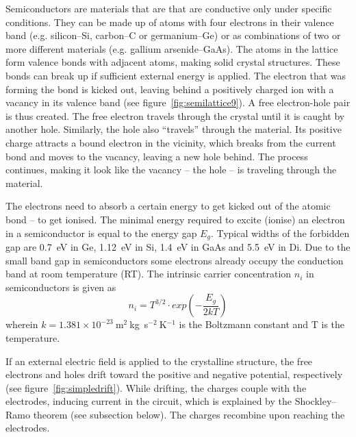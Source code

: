 \documentclass[twoside,12pt]{packages/mytustyle}  %
\begin{document}
Semiconductors are materials that are that are conductive only under specific conditions. They can be made up of atoms with four electrons in their valence band (e.g. silicon--Si, carbon--C or germanium--Ge) or as combinations of two or more different materials (e.g. gallium arsenide--GaAs). The atoms in the lattice form valence bonds with adjacent atoms, making solid crystal structures. These bonds can break up if sufficient external energy is applied. The electron that was forming the bond is kicked out, leaving behind a positively charged ion with a vacancy in its valence band (see figure~\ref{fig:semilattice9}). A free electron-hole pair is thus created. The free electron travels through the crystal until it is caught by another hole. Similarly, the hole also ``travels'' through the material. Its positive charge attracts a bound electron in the vicinity, which breaks from the current bond and moves to the vacancy, leaving a new hole behind. The process continues, making it look like the vacancy -- the hole -- is traveling through the material.




The electrons need to absorb a certain energy to get kicked out of the atomic bond -- to get ionised. The minimal energy required to excite (ionise) an electron in a semiconductor is equal to the energy gap $E_g$. Typical widths of the forbidden gap are 0.7~eV in Ge, 1.12~eV in Si, 1.4~eV in GaAs and 5.5~eV in Di. Due to the small band gap in semiconductors some electrons already occupy the conduction band at room temperature (RT). The intrinsic carrier concentration $n_i$ in semiconductors is given as
\begin{equation}
\label{eq:intrinsiccarrier}
n_i = T^{3/2} \cdot exp(-\frac{E_g}{2kT}) 
\end{equation} 
wherein $k = 1.381\times10^{-23}~$m$^2~$kg~s$^{-2}~$K$^{-1}$ is the Boltzmann constant and T is the temperature. 

If an external electric field is applied to the crystalline structure, the free electrons and holes drift toward the positive and negative potential, respectively (see figure~\ref{fig:simpledrift}). While drifting, the charges couple with the electrodes, inducing current in the circuit, which is explained by the Shockley--Ramo theorem (see subsection below). The charges recombine upon reaching the electrodes.
\end{document}
